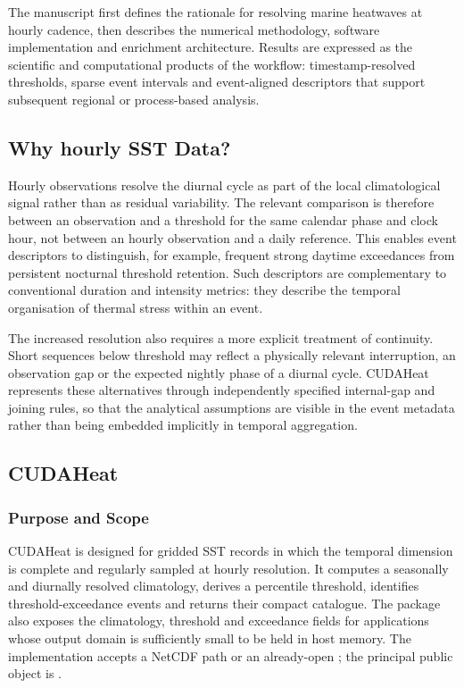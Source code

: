 The manuscript first defines the rationale for resolving marine heatwaves at hourly cadence, then describes the numerical methodology, software implementation and enrichment architecture. Results are expressed as the scientific and computational products of the workflow: timestamp-resolved thresholds, sparse event intervals and event-aligned descriptors that support subsequent regional or process-based analysis.

\subsection{Why hourly SST Data?}

Hourly observations resolve the diurnal cycle as part of the local climatological signal rather than as residual variability. The relevant comparison is therefore between an observation and a threshold for the same calendar phase and clock hour, not between an hourly observation and a daily reference. This enables event descriptors to distinguish, for example, frequent strong daytime exceedances from persistent nocturnal threshold retention. Such descriptors are complementary to conventional duration and intensity metrics: they describe the temporal organisation of thermal stress within an event.

The increased resolution also requires a more explicit treatment of continuity. Short sequences below threshold may reflect a physically relevant interruption, an observation gap or the expected nightly phase of a diurnal cycle. CUDAHeat represents these alternatives through independently specified internal-gap and joining rules, so that the analytical assumptions are visible in the event metadata rather than being embedded implicitly in temporal aggregation.


\subsection{CUDAHeat}

\subsubsection{Purpose and Scope}

CUDAHeat is designed for gridded SST records in which the temporal dimension is complete and regularly sampled at hourly resolution. It computes a seasonally and diurnally resolved climatology, derives a percentile threshold, identifies threshold-exceedance events and returns their compact catalogue. The package also exposes the climatology, threshold and exceedance fields for applications whose output domain is sufficiently small to be held in host memory. The implementation accepts a NetCDF path or an already-open ; the principal public object is .

